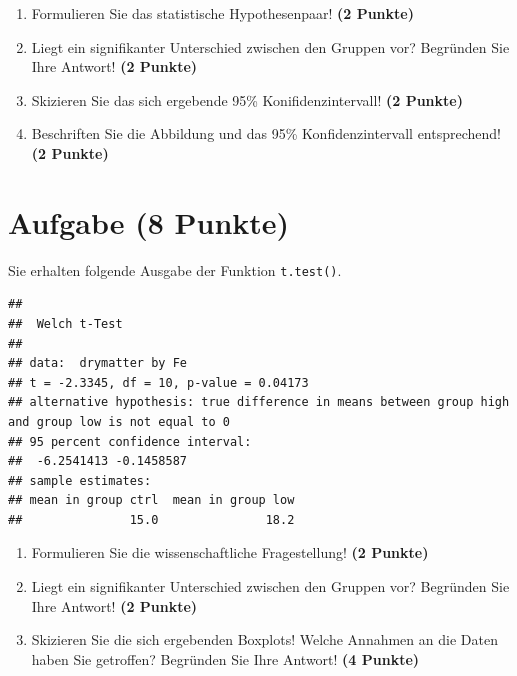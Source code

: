 \documentclass[a4paper, 10pt]{scrartcl}\usepackage[]{graphicx}\usepackage[]{xcolor}
\makeatletter
\newenvironment{kframe}{%
 \def\at@end@of@kframe{}%
 \ifinner\ifhmode%
  \def\at@end@of@kframe{\end{minipage}}%
  \begin{minipage}{\columnwidth}%
 \fi\fi%
 \def\FrameCommand##1{\hskip\@totalleftmargin \hskip-\fboxsep
 \colorbox{shadecolor}{##1}\hskip-\fboxsep
     \hskip-\linewidth \hskip-\@totalleftmargin \hskip\columnwidth}%
 \MakeFramed {\advance\hsize-\width
   \@totalleftmargin\z@ \linewidth\hsize
   \@setminipage}}%
 {\par\unskip\endMakeFramed%
 \at@end@of@kframe}
\newenvironment{knitrout}{}{} %
\makeatother
\begin{document}
\begin{enumerate}
  \item Formulieren Sie das statistische Hypothesenpaar! \textbf{(2
Punkte)}
\item Liegt ein signifikanter Unterschied zwischen den Gruppen vor?
  Begr{\"u}nden Sie Ihre Antwort! \textbf{(2 Punkte)}
\item Skizieren Sie das sich ergebende 95\% Konifidenzintervall! \textbf{(2 Punkte)}
\item Beschriften Sie die Abbildung und
  das 95\% Konfidenzintervall entsprechend! \textbf{(2 Punkte)}  
\end{enumerate} 
\clearpage

\section{Aufgabe \hfill (8 Punkte)}

Sie erhalten folgende \Rlogo Ausgabe der Funktion \texttt{t.test()}.

\begin{knitrout}
\color{fgcolor}\begin{kframe}
\begin{verbatim}
## 
## 	Welch t-Test
## 
## data:  drymatter by Fe
## t = -2.3345, df = 10, p-value = 0.04173
## alternative hypothesis: true difference in means between group high and group low is not equal to 0
## 95 percent confidence interval:
##  -6.2541413 -0.1458587
## sample estimates:
## mean in group ctrl  mean in group low 
##               15.0               18.2
\end{verbatim}
\end{kframe}
\end{knitrout}


\begin{enumerate}
  \item Formulieren Sie die wissenschaftliche Fragestellung! \textbf{(2
Punkte)}
\item Liegt ein signifikanter Unterschied zwischen den Gruppen vor?
  Begr{\"u}nden Sie Ihre Antwort! \textbf{(2 Punkte)}
\item Skizieren Sie die sich ergebenden Boxplots! Welche Annahmen an die Daten haben Sie getroffen? Begr{\"u}nden Sie Ihre Antwort! \textbf{(4 Punkte)} 
\end{enumerate}
 
\clearpage
\end{document}
